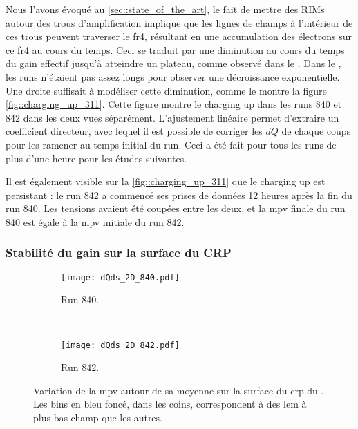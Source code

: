         Nous l'avons évoqué au \autoref{sec::state_of_the_art}, le fait de mettre des RIMs autour des trous d'amplification implique que les lignes de champs à l'intérieur de ces trous peuvent traverser le \gls{fr4}, résultant en une accumulation des électrons sur ce \gls{fr4} au cours du temps. Ceci se traduit par une diminution au cours du temps du gain effectif jusqu'à atteindre un plateau, comme observé dans le \threeL{}\cite{Cantini2014}. Dans le \TOO{}, les runs n'étaient pas assez longs pour observer une décroissance exponentielle. Une droite suffisait à modéliser cette diminution, comme le montre la figure \autoref{fig::charging_up_311}. Cette figure montre le charging up dans les runs 840 et 842 dans les deux vues séparément. L'ajustement linéaire permet d'extraire un coefficient directeur, avec lequel il est possible de corriger les $dQ$ de chaque coups pour les ramener au temps initial du run. Ceci a été fait pour tous les runs de plus d'une heure pour les études suivantes. 

        Il est également visible sur la \autoref{fig::charging_up_311} que le charging up est persistant : le run 842 a commencé ses prises de données 12 heures après la fin du run 840. Les tensions avaient été coupées entre les deux, et la \gls{mpv} finale du run 840 est égale à la \gls{mpv} initiale du run 842.


      \subsubsection{Stabilité du gain sur la surface du CRP}

        \begin{figure}[htbp]
          \centering
          \begin{subfigure}[t]{0.9\textwidth}
            \centering
            \texttt{[image: dQds\_2D\_840.pdf]}
            \caption{Run 840.}
          \end{subfigure}\\
          \begin{subfigure}[t]{0.9\textwidth}
            \centering
            \texttt{[image: dQds\_2D\_842.pdf]}
            \caption{Run 842.}
          \end{subfigure}
          \caption[Variation de la MPV sur la surface du CRP dans le \TOO{}]{\label{fig::stability}Variation de la \gls{mpv} autour de sa moyenne sur la surface du \gls{crp} du \TOO{}. Les bins en bleu foncé, dans les coins, correspondent à des \gls{lem} à plus bas champ que les autres.}
        \end{figure}

